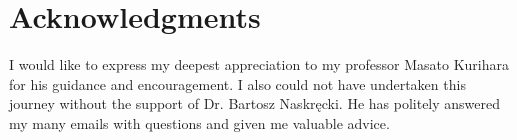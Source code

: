 \documentclass[main]{subfiles}
\begin{document}
{}
\section*{Acknowledgments}
I would like to express my deepest appreciation to my professor Masato Kurihara for his guidance and encouragement.
I also could not have undertaken this journey without the support of Dr. Bartosz Naskręcki.
He has politely answered my many emails with questions and given me valuable advice.
\end{document}
